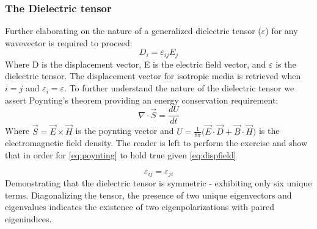 \subsubsection{The Dielectric tensor}
Further elaborating on the nature of a generalized dielectric tensor ($\varepsilon$) for any wavevector is required to proceed:
\begin{equation}\label{eq:dispfield}
D_i = \varepsilon_{ij}E_j
\end{equation}
Where D is the displacement vector, E is the electric field vector, and $\varepsilon$ is the dielectric tensor. The displacement vector for isotropic media is retrieved when $i = j$ and $\varepsilon_i = \varepsilon$. To further understand the nature of the dielectric tensor we assert Poynting's theorem providing an energy conservation requirement:
\begin{equation}\label{eq:poynting}
\nabla \cdot \vec{S} = \frac{dU}{dt}
\end{equation}
Where $\vec{S} = \vec{E} \times \vec{H}$ is the poynting vector and $U = \frac{1}{8 \pi} \big( \vec{E} \cdot \vec{D} + \vec{B} \cdot \vec{H} \big)$ is the electromagnetic field density. The reader is left to perform the exercise and show that in order for \autoref{eq:poynting} to hold true given \autoref{eq:dispfield}


\begin{equation}
\varepsilon_{ij} = \varepsilon_{ji}
\end{equation}
Demonstrating that the dielectric tensor is symmetric - exhibiting only six unique terms. Diagonalizing the tensor, the presence of two unique eigenvectors and eigenvalues indicates the existence of two eigenpolarizations with paired eigenindices.


